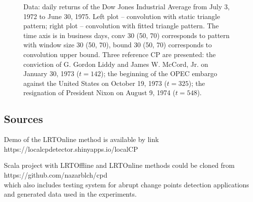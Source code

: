 \begin{figure}[ht!]
     \begin{center}
         
         
%
    \end{center}
    \caption{%
        Data: daily returns of the Dow Jones Industrial Average from July 3, 1972 to June 30, 1975.
        Left plot -- convolution with static triangle pattern; right plot -- convolution with fitted triangle pattern. The time axis is in business days, conv 30 (50, 70) corresponds to pattern with window size 30 (50, 70), bound 30 (50, 70) corresponds to convolution upper bound. Three reference CP are presented: the conviction of G. Gordon Liddy and James W. McCord, Jr. on January 30, 1973 ($t = 142$); the beginning of the OPEC embargo against the United States on October 19, 1973 ($t = 325$); the resignation of President Nixon on August 9, 1974 ($t = 548$).
     }%
   \label{fig:subfigures}
\end{figure}


\subsection{Sources}

Demo of the LRTOnline method is available by link  \\ https://localcpdetector.shinyapps.io/localCP

Scala project with LRTOffline and LRTOnline methods could be cloned from \\
https://github.com/nazarblch/cpd \\
which also includes testing system for abrupt change points detection applications and generated data used in the experiments. 





